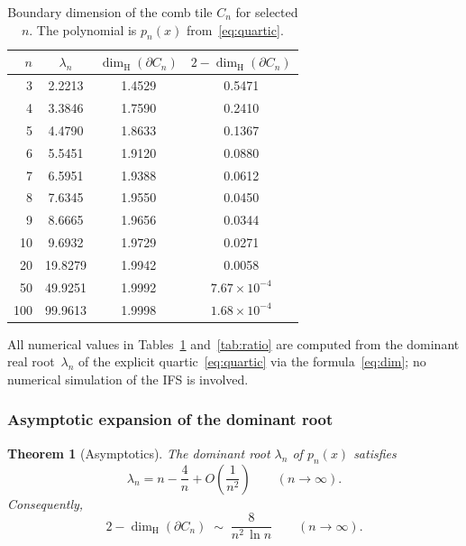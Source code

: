 \documentclass{amsart}
\newtheorem{theorem}{Theorem}[section]
\theoremstyle{definition}
\theoremstyle{remark}
\newcommand{\dH}{\dim_{\mathrm{H}}}
\begin{document}
\begin{table}[h]
\centering
\caption{Boundary dimension of the comb tile $C_n$ for selected $n$.
The polynomial is $p_n(x)$ from~\eqref{eq:quartic}.}
\label{tab:dims}
\begin{tabular}{rccc}
\toprule
$n$ & $\lambda_n$ & $\dH(\partial C_n)$ & $2 - \dH(\partial C_n)$ \\
\midrule
  3 & 2.2213 & 1.4529 & 0.5471 \\
  4 & 3.3846 & 1.7590 & 0.2410 \\
  5 & 4.4790 & 1.8633 & 0.1367 \\
  6 & 5.5451 & 1.9120 & 0.0880 \\
  7 & 6.5951 & 1.9388 & 0.0612 \\
  8 & 7.6345 & 1.9550 & 0.0450 \\
  9 & 8.6665 & 1.9656 & 0.0344 \\
 10 & 9.6932 & 1.9729 & 0.0271 \\
 20 & 19.8279 & 1.9942 & 0.0058 \\
 50 & 49.9251 & 1.9992 & $7.67 \times 10^{-4}$ \\
100 & 99.9613 & 1.9998 & $1.68 \times 10^{-4}$ \\
\bottomrule
\end{tabular}
\end{table}

All numerical values in Tables~\ref{tab:dims} and~\ref{tab:ratio}
are computed from the dominant real root~$\lambda_n$ of the
explicit quartic~\eqref{eq:quartic} via the
formula~\eqref{eq:dim}; no numerical simulation of the IFS is
involved.

\subsubsection{Asymptotic expansion of the dominant root}

\begin{theorem}[Asymptotics]\label{thm:asymp}
The dominant root $\lambda_n$ of $p_n(x)$ satisfies
\begin{equation}\label{eq:lambda-asymp}
  \lambda_n = n - \frac{4}{n} + O\!\left(\frac{1}{n^2}\right)
  \qquad (n \to \infty).
\end{equation}
Consequently,
\begin{equation}\label{eq:dim-asymp}
  2 - \dH(\partial C_n) \;\sim\; \frac{8}{n^2\,\ln n}
  \qquad (n \to \infty).
\end{equation}
\end{theorem}
\end{document}
